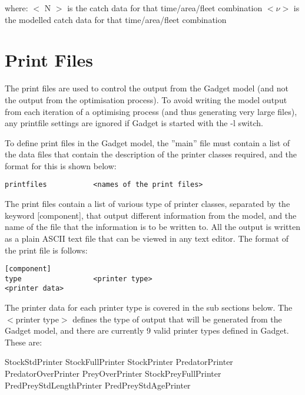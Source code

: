 \documentclass [a4paper, 10pt]{book}
\begin{document}
where:\newline
$<$ N $>$ is the catch data for that time/area/fleet combination\newline
$<\nu>$ is the modelled catch data for that time/area/fleet combination

\chapter{Print Files}\label{chap:print}
The print files are used to control the output from the Gadget model (and not the output from the optimisation process).  To avoid writing the model output from each iteration of a optimising process (and thus generating very large files), any printfile settings are ignored if Gadget is started with the -l switch.

\bigskip
To define print files in the Gadget model, the ''main'' file must contain a list of the data files that contain the description of the printer classes required, and the format for this is shown below:

{\small\begin{verbatim}
printfiles           <names of the print files>
\end{verbatim}}

The print files contain a list of various type of printer classes, separated by the keyword [component], that output different information from the model, and the name of the file that the information is to be written to.  All the output is written as a plain ASCII text file that can be viewed in any text editor.  The format of the print file is follows:

{\small\begin{verbatim}
[component]
type                 <printer type>
<printer data>
\end{verbatim}}

The printer data for each printer type is covered in the sub sections below.  The $<$printer type$>$ defines the type of output that will be generated from the Gadget model, and there are currently 9 valid printer types defined in Gadget.  These are:

\bigskip
StockStdPrinter\newline
StockFullPrinter\newline
StockPrinter\newline
PredatorPrinter\newline
PredatorOverPrinter\newline
PreyOverPrinter\newline
StockPreyFullPrinter\newline
PredPreyStdLengthPrinter\newline
PredPreyStdAgePrinter
\end{document}
